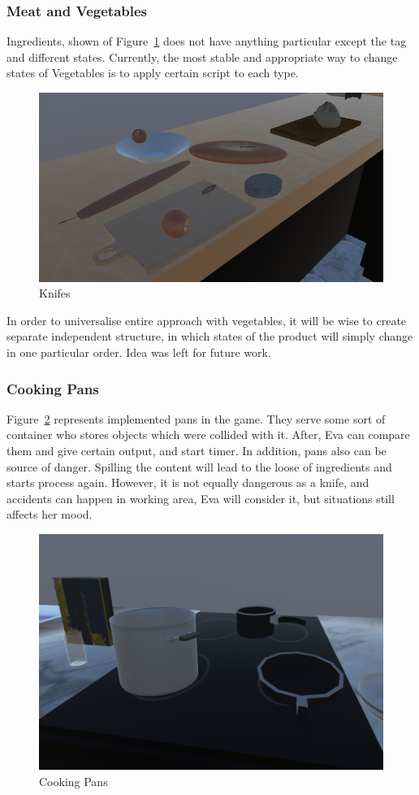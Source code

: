 \documentclass[18pt]{article}
\numberwithin{equation}{section} %
\numberwithin{figure}{section} %
\numberwithin{table}{section} %
\begin{document}
		\subsubsection{Meat and Vegetables}
			Ingredients, shown of Figure~\ref{fig:food} does not have anything particular except the tag and different states. Currently, the most stable and appropriate way to change states of Vegetables is to apply certain script to each type. \\
				\begin{figure}[H]
					\centering
					\includegraphics[width=0.5\linewidth]{images/food}
					\caption{Knifes}
					\label{fig:food}
				\end{figure}
			In order to universalise entire approach with vegetables, it will be wise to create separate independent structure, in which states of the product will simply change in one particular order. Idea was left for future work. \\
		\subsubsection{Cooking Pans}
			Figure~\ref{fig:pans} represents implemented pans in the game. They serve some sort of container who stores objects which were collided with it. After, Eva can compare them and give certain output, and start timer. In addition, pans also can be source of danger. Spilling the content will lead to the loose of ingredients and starts process again. However, it is not equally dangerous as a knife, and accidents can happen in working area, Eva will consider it, but situations still affects her mood.
			\begin{figure}[H]
				\centering
				\includegraphics[width=0.5\linewidth]{images/pans}
				\caption{Cooking Pans}
				\label{fig:pans}
			\end{figure}
		
\end{document}
